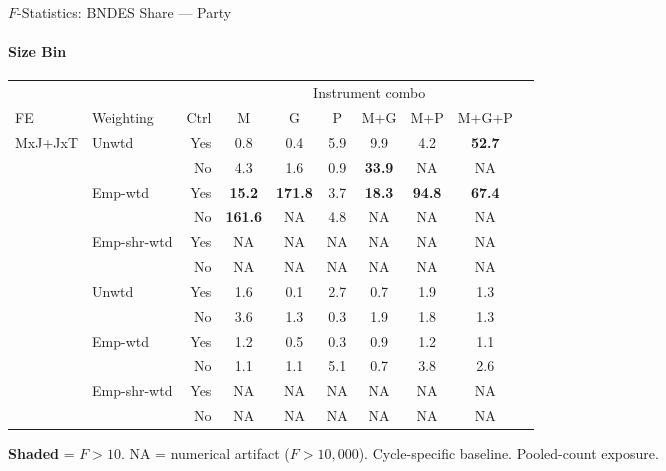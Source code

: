 \documentclass[aspectratio=169,10pt]{beamer}
\newcommand{\fpass}[1]{\cellcolor{pass}\textbf{#1}}
\begin{document}
\begin{frame}[t]{$F$-Statistics: BNDES Share --- Party}
\framesubtitle{Size Bin}
\begin{center}
\footnotesize
\setlength{\tabcolsep}{3.5pt}
\renewcommand{\arraystretch}{1.05}
\begin{tabular}{@{}llrccccccc@{}}
\toprule
 & & & \multicolumn{6}{c}{Instrument combo} \\
\cmidrule(l{2pt}r{2pt}){4-9}
FE & Weighting & Ctrl & M & G & P & M+G & M+P & M+G+P \\
\midrule
  \multirow{6}{*}{MxJ+JxT} & \multirow{2}{*}{Unwtd} & Yes & 0.8 & 0.4 & 5.9 & 9.9 & 4.2 & \fpass{52.7} \\
   &  & No & 4.3 & 1.6 & 0.9 & \fpass{33.9} & NA & NA \\
   & \multirow{2}{*}{Emp-wtd} & Yes & \fpass{15.2} & \fpass{171.8} & 3.7 & \fpass{18.3} & \fpass{94.8} & \fpass{67.4} \\
   &  & No & \fpass{161.6} & NA & 4.8 & NA & NA & NA \\
   & \multirow{2}{*}{Emp-shr-wtd} & Yes & NA & NA & NA & NA & NA & NA \\
   &  & No & NA & NA & NA & NA & NA & NA \\
\addlinespace[5pt]
  \multirow{6}{*}{MxJ+MxT} & \multirow{2}{*}{Unwtd} & Yes & 1.6 & 0.1 & 2.7 & 0.7 & 1.9 & 1.3 \\
   &  & No & 3.6 & 1.3 & 0.3 & 1.9 & 1.8 & 1.3 \\
   & \multirow{2}{*}{Emp-wtd} & Yes & 1.2 & 0.5 & 0.3 & 0.9 & 1.2 & 1.1 \\
   &  & No & 1.1 & 1.1 & 5.1 & 0.7 & 3.8 & 2.6 \\
   & \multirow{2}{*}{Emp-shr-wtd} & Yes & NA & NA & NA & NA & NA & NA \\
   &  & No & NA & NA & NA & NA & NA & NA \\
\bottomrule
\end{tabular}
\end{center}
{\scriptsize \colorbox{pass}{\textbf{Shaded}} = $F>10$. NA = numerical artifact ($F>10{,}000$). Cycle-specific baseline. Pooled-count exposure.}
\end{frame}

\end{document}
